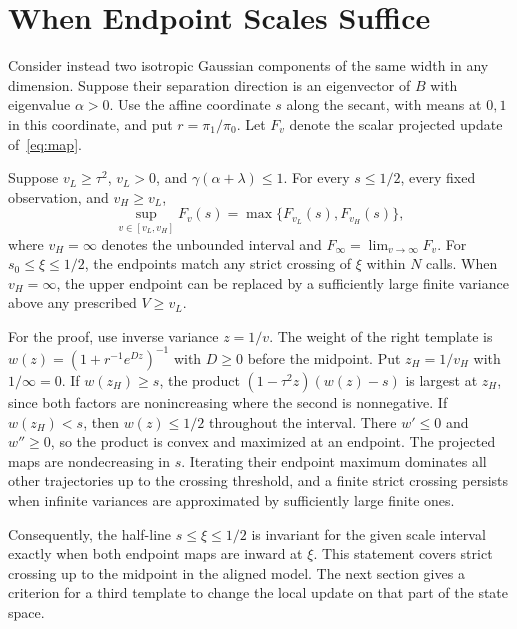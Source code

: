 \section{When Endpoint Scales Suffice}\label{sec:two_endpoints}
Consider instead two isotropic Gaussian components of the same width
in any dimension. Suppose their separation direction is an
eigenvector of $B$ with eigenvalue $\alpha>0$. Use the affine coordinate
$s$ along the secant, with means at $0,1$ in this coordinate, and put
$r=\pi_1/\pi_0$. Let $F_v$ denote the scalar projected update of~\eqref{eq:map}.

\begin{proposition}\label{prop:two_endpoints}
Suppose $v_L\ge\tau^2$, $v_L>0$, and $\gamma(\alpha+\lambda)\le1$.
For every $s\le1/2$, every fixed observation, and $v_H\ge v_L$,
\begin{equation}\label{eq:two_endpoints}
 \sup_{v\in[v_L,v_H]}F_v(s)=\max\{F_{v_L}(s),F_{v_H}(s)\},
\end{equation}
where $v_H=\infty$ denotes the unbounded interval and
$F_\infty=\lim_{v\to\infty}F_v$.
For $s_0\le\xi\le1/2$, the endpoints match any strict crossing
of $\xi$ within $N$ calls. When $v_H=\infty$, the upper endpoint
can be replaced by a sufficiently large finite variance above
any prescribed $V\ge v_L$.
\end{proposition}

For the proof, use inverse variance $z=1/v$. The weight of the
right template is $w(z)=(1+r^{-1}e^{Dz})^{-1}$ with $D\ge0$
before the midpoint. Put $z_H=1/v_H$ with $1/\infty=0$.
If $w(z_H)\ge s$, the product $(1-\tau^2 z)(w(z)-s)$
is largest at $z_H$, since both factors are nonincreasing where the
second is nonnegative. If $w(z_H)<s$, then $w(z)\le1/2$
throughout the interval. There $w'\le0$ and $w''\ge0$,
so the product is convex and maximized at an endpoint. The projected maps
are nondecreasing in $s$. Iterating their endpoint maximum dominates
all other trajectories up to the crossing threshold, and a finite
strict crossing persists when infinite variances are approximated
by sufficiently large finite ones.

Consequently, the half-line $s\le\xi\le1/2$ is invariant for the
given scale interval exactly when both endpoint maps are inward at $\xi$.
This statement covers strict crossing up to the midpoint in the aligned
model. The next section gives a criterion for a third template to
change the local update on that part of the state space.
